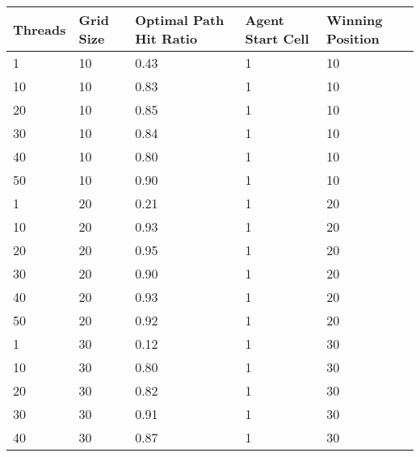 \documentclass[12pt]{article}
\begin{document}
\begin{table}[H]
  \centering
    \begin{tabular}{|l|l|l|l|l|}
    \hline
    Threads & Grid Size & Optimal Path Hit Ratio & Agent Start Cell & Winning Position  \\ 
    \hline
    1       & 10        & 0.43                   & 1                & 10                \\ 
    \hline
    10      & 10        & 0.83                   & 1                & 10                \\ 
    \hline
    20      & 10        & 0.85                   & 1                & 10                \\ 
    \hline
    30      & 10        & 0.84                   & 1                & 10                \\ 
    \hline
    40      & 10        & 0.80                   & 1                & 10                \\ 
    \hline
    50      & 10        & 0.90                   & 1                & 10                \\ 
    \hline
    1       & 20        & 0.21                   & 1                & 20                \\ 
    \hline
    10      & 20        & 0.93                   & 1                & 20                \\ 
    \hline
    20      & 20        & 0.95                   & 1                & 20                \\ 
    \hline
    30      & 20        & 0.90                   & 1                & 20                \\ 
    \hline
    40      & 20        & 0.93                   & 1                & 20                \\ 
    \hline
    50      & 20        & 0.92                   & 1                & 20                \\ 
    \hline
    1       & 30        & 0.12                   & 1                & 30                \\ 
    \hline
    10      & 30        & 0.80                   & 1                & 30                \\ 
    \hline
    20      & 30        & 0.82                   & 1                & 30                \\ 
    \hline
    30      & 30        & 0.91                   & 1                & 30                \\ 
    \hline
    40      & 30        & 0.87                   & 1                & 30                \\ 

\end{tabular}
\end{table}
\end{document}
